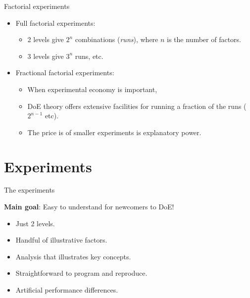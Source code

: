 \documentclass[english,usenames,dvipsnames,aspectratio=169]{beamer}
\begin{document}
\begin{frame}{Factorial experiments}

  \begin{itemize}
  \item Full factorial experiments:
    \begin{itemize}
    \item 2 levels give $2^n$ combinations (\emph{runs}), where $n$ is
      the number of factors.
    \item 3 levels give $3^n$ runs, etc.
    \end{itemize}
  \item Fractional factorial experiments:

    \begin{itemize}
    \item When experimental economy is important,
    \item DoE theory offers extensive facilities for running a
      fraction of the runs ($2^{n-1}$ etc).
    \item The price is of smaller experiments is explanatory power.
    \end{itemize}
  \end{itemize}
\end{frame}




\section{Experiments}

\begin{frame}{The experiments}

\textbf{Main goal}: Easy to understand for newcomers to DoE!

\begin{itemize}
\item Just 2 levels.
\item Handful of illustrative factors.
\item Analysis that illustrates key concepts.
\item Straightforward to program and reproduce.
\item Artificial performance differences.
\end{itemize}

\end{frame}
\end{document}
